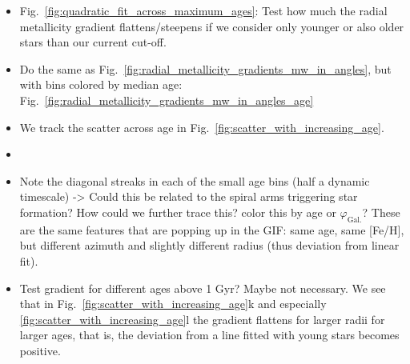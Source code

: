\documentclass[fleqn,usenatbib]{mnras}
\begin{document}
\begin{itemize}
    \item Fig.~\ref{fig:quadratic_fit_across_maximum_ages}: Test how much the radial metallicity gradient flattens/steepens if we consider only younger or also older stars than our current cut-off.
    \item Do the same as Fig.~\ref{fig:radial_metallicity_gradients_mw_in_angles}, but with bins colored by median age: Fig.~\ref{fig:radial_metallicity_gradients_mw_in_angles_age}
    \item We track the scatter across age in Fig.~\ref{fig:scatter_with_increasing_age}.
    \item 
    \item Note the diagonal streaks in each of the small age bins (half a dynamic timescale) -> Could this be related to the spiral arms triggering star formation? How could we further trace this? color this by age or $\varphi_\mathrm{Gal.}$? These are the same features that are popping up in the GIF: same age, same [Fe/H], but different azimuth and slightly different radius (thus deviation from linear fit).
    \item Test gradient for different ages above 1 Gyr? Maybe not necessary. We see that in Fig.~\ref{fig:scatter_with_increasing_age}k and especially \ref{fig:scatter_with_increasing_age}l the gradient flattens for larger radii for larger ages, that is, the deviation from a line fitted with young stars becomes positive.
\end{itemize}
\end{document}
